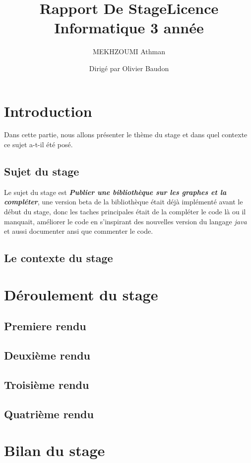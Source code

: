 \documentclass[12pt]{article}
\title{Rapport De Stage}
\title{Licence Informatique 3\up{ème} année}
\author{MEKHZOUMI Athman}
\author{Dirigé par Olivier Baudon}
\begin{document}
\maketitle
\tableofcontents
\newpage

\section{Introduction}

Dans cette partie, nous allons présenter le thème du stage et dans quel contexte ce sujet a-t-il été posé.

\subsection{Sujet du stage}

Le sujet du stage est \textit{\textbf{Publier une bibliothèque sur les graphes et la compléter}}, une version beta de la bibliothèque était déjà implémenté avant le début du stage, donc les taches principales était de la compléter le code là ou il manquait, améliorer le code en s'inspirant des nouvelles version du langage \textit{java} et aussi documenter ansi que commenter le code.

\subsection{Le contexte du stage}

\section{Déroulement du stage}
\subsection{Premiere rendu}
\subsection{Deuxième rendu}
\subsection{Troisième rendu}
\subsection{Quatrième rendu}

\section{Bilan du stage}
\end{document}

